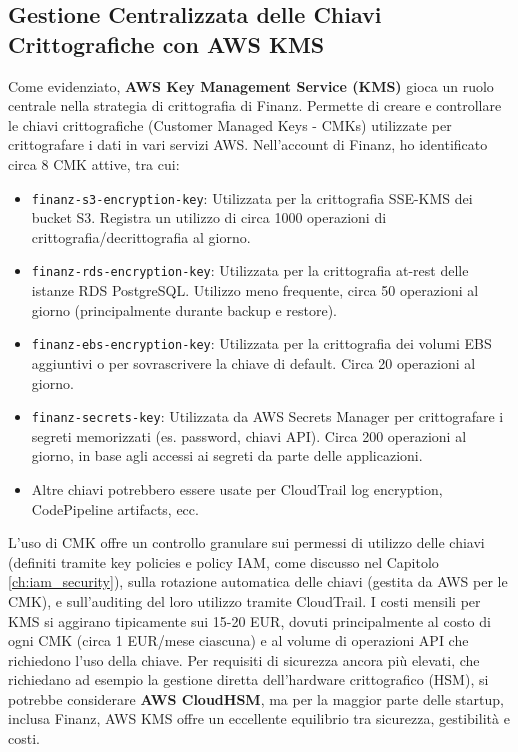 \subsection{Gestione Centralizzata delle Chiavi Crittografiche con AWS KMS}
\label{subsec:kms_cap2}
Come evidenziato, \textbf{AWS Key Management Service (KMS)} gioca un ruolo centrale nella strategia di crittografia di Finanz. Permette di creare e controllare le chiavi crittografiche (Customer Managed Keys - CMKs) utilizzate per crittografare i dati in vari servizi AWS. Nell'account di Finanz, ho identificato circa 8 CMK attive, tra cui:
\begin{itemize}
    \item \texttt{finanz-s3-encryption-key}: Utilizzata per la crittografia SSE-KMS dei bucket S3. Registra un utilizzo di circa 1000 operazioni di crittografia/decrittografia al giorno.
    \item \texttt{finanz-rds-encryption-key}: Utilizzata per la crittografia at-rest delle istanze RDS PostgreSQL. Utilizzo meno frequente, circa 50 operazioni al giorno (principalmente durante backup e restore).
    \item \texttt{finanz-ebs-encryption-key}: Utilizzata per la crittografia dei volumi EBS aggiuntivi o per sovrascrivere la chiave di default. Circa 20 operazioni al giorno.
    \item \texttt{finanz-secrets-key}: Utilizzata da AWS Secrets Manager per crittografare i segreti memorizzati (es. password, chiavi API). Circa 200 operazioni al giorno, in base agli accessi ai segreti da parte delle applicazioni.
    \item Altre chiavi potrebbero essere usate per CloudTrail log encryption, CodePipeline artifacts, ecc.
\end{itemize}
L'uso di CMK offre un controllo granulare sui permessi di utilizzo delle chiavi (definiti tramite key policies e policy IAM, come discusso nel Capitolo \ref{ch:iam_security}), sulla rotazione automatica delle chiavi (gestita da AWS per le CMK), e sull'auditing del loro utilizzo tramite CloudTrail. I costi mensili per KMS si aggirano tipicamente sui 15-20 EUR, dovuti principalmente al costo di ogni CMK (circa 1 EUR/mese ciascuna) e al volume di operazioni API che richiedono l'uso della chiave.
Per requisiti di sicurezza ancora più elevati, che richiedano ad esempio la gestione diretta dell'hardware crittografico (HSM), si potrebbe considerare \textbf{AWS CloudHSM}, ma per la maggior parte delle startup, inclusa Finanz, AWS KMS offre un eccellente equilibrio tra sicurezza, gestibilità e costi.

